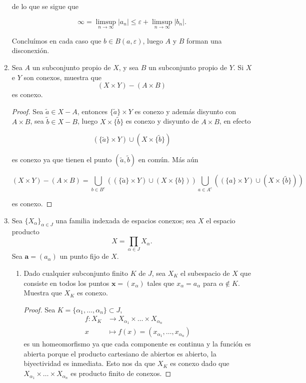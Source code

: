 \documentclass[11pt]{article}
\begin{document}
\begin{enumerate}
 de lo que se sigue que

 $$\infty=\limsup_{n \to \infty} |a_n|\leq \varepsilon +\limsup_{n \to \infty} |b_n|.$$

Concluímos en cada caso que $b\in B(a,\varepsilon)$, luego $A$ y $B$ forman una disconexión.

\item Sea $A$ un subconjunto propio de $X$, y sea $B$ un subconjunto propio de $Y$. Si $X$ e $Y$ son conexos, muestra que
    \[
    (X \times Y) - (A \times B)
    \]
    es conexo.

\begin{proof}
    Sea $\tilde{a}\in X-A$, entonces $\{\tilde{a}\}\times Y$ es conexo y además disyunto con $A\times B$, sea $\tilde{b}\in X-B$, luego $X\times \{\tilde{b}\}$ es conexo  y disyunto de $A\times B$, en efecto 

    $$(\{\tilde{a}\}\times Y)\cup (X\times \{\tilde{b}\})$$

es conexo ya que tienen el punto $(\tilde{a},\tilde{b})$ en común. Más aún

$$(X\times Y)-(A\times B)=\bigcup_{b\in B^{c}}((\{\tilde{a}\}\times Y)\cup (X\times \{b\})) \bigcup_{a\in A^c}((\{a\}\times Y)\cup(X\times \{\tilde{b}\}) ) 
$$

es conexo.
\end{proof}

    \item Sea $\{X_\alpha\}_{\alpha \in J}$ una familia indexada de espacios conexos; sea $X$ el espacio producto
    \[
    X = \prod_{\alpha \in J} X_\alpha.
    \]
    Sea $\mathbf{a} = (a_\alpha)$ un punto fijo de $X$.
    \begin{enumerate}
        \item Dado cualquier subconjunto finito $K$ de $J$, sea $X_K$ el subespacio de $X$ que consiste en todos los puntos $\mathbf{x} = (x_\alpha)$ tales que $x_\alpha = a_\alpha$ para $\alpha \notin K$. Muestra que $X_K$ es conexo.

        \begin{proof}
            Sea $K=\{\alpha_1,\ldots,\alpha_n\}\subset J$,
                \begin{align*}
                    f : X_K &\longrightarrow X_{\alpha_1}\times\ldots\times X_{\alpha_n} \\
                    x &\longmapsto f(x) = (x_{\alpha_1},\ldots,x_{\alpha_n})
                \end{align*}
es un homeomorfismo ya que cada componente es continua y la función es abierta porque el producto cartesiano de abiertos es abierto, la biyectividad es inmediata. Esto nos da que $X_K$ es conexo dado que $X_{\alpha_1}\times\ldots\times X_{\alpha_n}$ es producto finito de conexos.


\end{proof}
\end{enumerate}
\end{enumerate}
\end{document}
